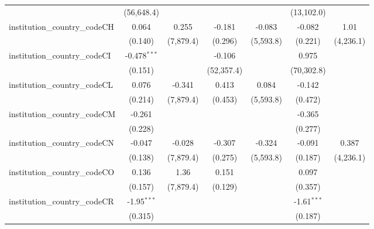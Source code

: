\begin{tabular}{lcccccc}
                                         & (56,648.4)     &               &                &               & (13,102.0)     &   \\   
   institution\_country\_codeCH          & 0.064          & 0.255         & -0.181         & -0.083        & -0.082         & 1.01\\   
                                         & (0.140)        & (7,879.4)     & (0.296)        & (5,593.8)     & (0.221)        & (4,236.1)\\   
   institution\_country\_codeCI          & -0.478$^{***}$ &               & -0.106         &               & 0.975          &   \\   
                                         & (0.151)        &               & (52,357.4)     &               & (70,302.8)     &   \\   
   institution\_country\_codeCL          & 0.076          & -0.341        & 0.413          & 0.084         & -0.142         &   \\   
                                         & (0.214)        & (7,879.4)     & (0.453)        & (5,593.8)     & (0.472)        &   \\   
   institution\_country\_codeCM          & -0.261         &               &                &               & -0.365         &   \\   
                                         & (0.228)        &               &                &               & (0.277)        &   \\   
   institution\_country\_codeCN          & -0.047         & -0.028        & -0.307         & -0.324        & -0.091         & 0.387\\   
                                         & (0.138)        & (7,879.4)     & (0.275)        & (5,593.8)     & (0.187)        & (4,236.1)\\   
   institution\_country\_codeCO          & 0.136          & 1.36          & 0.151          &               & 0.097          &   \\   
                                         & (0.157)        & (7,879.4)     & (0.129)        &               & (0.357)        &   \\   
   institution\_country\_codeCR          & -1.95$^{***}$  &               &                &               & -1.61$^{***}$  &   \\   
                                         & (0.315)        &               &                &               & (0.187)        &   \\   

\end{tabular}
